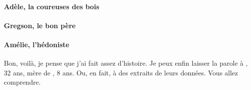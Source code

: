 







\paragraph{Adèle, la coureuses des bois}

\paragraph{Gregson, le bon père} 

\paragraph{Amélie, l'hédoniste}

Bon, voilà, je pense que j'ai fait assez d'histoire. Je peux enfin laisser la
parole à \nomMere, 32 ans, mère de \nomEnfant, 8 ans. Ou, en fait, à des
extraits de leurs données. Vous allez comprendre.


